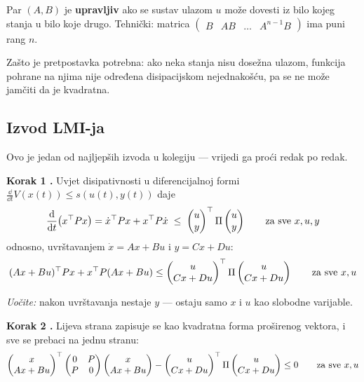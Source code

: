 \begin{napomena}[upravljivost]
Par $(A,B)$ je \textbf{upravljiv} ako se sustav ulazom $u$ može dovesti iz bilo
kojeg stanja u bilo koje drugo. Tehnički: matrica
$\begin{pmatrix}B & AB & \dots & A^{n-1}B\end{pmatrix}$ ima puni rang $n$.

Zašto je pretpostavka potrebna: ako neka stanja nisu dosežna ulazom, funkcija
pohrane na njima nije određena disipacijskom nejednakošću, pa se ne može
jamčiti da je kvadratna.
\end{napomena}

\subsection{Izvod LMI-ja}

Ovo je jedan od najljepših izvoda u kolegiju --- vrijedi ga proći redak po
redak.

\textbf{Korak 1 .} Uvjet disipativnosti u diferencijalnoj formi
$\frac{\dd}{\dd t}V(x(t)) \le s(u(t),y(t))$ daje
\[
\frac{\mathrm{d}}{\mathrm{d} t}\big(x^{\top} Px\big) = \dot x^{\top} Px + x^{\top} P\dot x
\;\le\; \begin{pmatrix}u\\y\end{pmatrix}^{\top}\Pi\begin{pmatrix}u\\y\end{pmatrix}
\qquad\text{za sve } x, u, y
\]
odnosno, uvrštavanjem $\dot x = Ax + Bu$ i $y = Cx + Du$:
\begin{equation}
\label{eq:disip-1}
(Ax+Bu)^{\top} Px + x^{\top} P(Ax+Bu)
\le \begin{pmatrix}u\\ Cx+Du\end{pmatrix}^{\top}\Pi
\begin{pmatrix}u\\ Cx+Du\end{pmatrix}
\qquad\text{za sve } x, u
\end{equation}

\emph{Uočite:} nakon uvrštavanja nestaje $y$ --- ostaju samo $x$ i $u$ kao
slobodne varijable.

\textbf{Korak 2 .} Lijeva strana zapisuje se kao kvadratna forma
proširenog vektora, i sve se prebaci na jednu stranu:
\[
\begin{pmatrix}x\\ Ax+Bu\end{pmatrix}^{\top}
\begin{pmatrix}0 & P\\ P & 0\end{pmatrix}
\begin{pmatrix}x\\ Ax+Bu\end{pmatrix}
- \begin{pmatrix}u\\ Cx+Du\end{pmatrix}^{\top}\Pi
\begin{pmatrix}u\\ Cx+Du\end{pmatrix} \le 0
\qquad\text{za sve } x, u
\]

